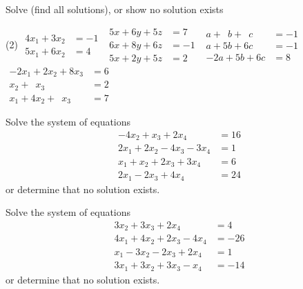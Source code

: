 \documentclass{ximera}
\begin{document}
\begin{exercise}%
    Solve (find all solutions), or show no solution exists
    \begin{tasks}(2)
        \task
        $\begin{aligned}
            4x_1+3x_2 & = -1 \\
            5x_1+6x_2 & = 4
        \end{aligned}$
        \task
        $\begin{aligned}
             5x+6y+5z & = 7 \\
             6x+8y+6z & = -1 \\
             5x+2y+5z & = 2
        \end{aligned}$
        \task
        $\begin{aligned}
            a+\phantom{5}b+\phantom{6}c & = -1 \\
            a+5b+6c & = -1 \\
            -2a+5b+6c & = 8
        \end{aligned}$
        \task
        $\begin{aligned}
            -2 x_1+2x_2+8x_3 & = 6 \\
            x_2+\phantom{8}x_3 & = 2 \\
            x_1+4x_2+\phantom{8}x_3 & = 7
        \end{aligned}$
    \end{tasks}
\end{exercise}

\begin{exercise}%
    Solve the system of equations
    \begin{equation*}
        \begin{split}
            -4x_2 + x_3 + 2x_4 &= 16 \\
            2x_1 + 2x_2 - 4x_3 - 3x_4 &= 1 \\
            x_1 + x_2 + 2x_3 + 3x_4 &= 6 \\
            2x_1 - 2x_3 + 4x_4 &= 24
        \end{split}
    \end{equation*}
    or determine that no solution exists. 
\end{exercise}

\begin{exercise}%
    Solve the system of equations
    \begin{equation*}
        \begin{split}
            3x_2 + 3x_3 + 2x_4 &= 4 \\
            4x_1 + 4x_2 + 2x_3 - 4x_4 &= -26 \\
            x_1 - 3x_2 -2x_3 + 2x_4 &= 1 \\
            3x_1 + 3x_2 + 3x_3  - x_4 &= -14
        \end{split}
    \end{equation*}
    or determine that no solution exists. 
\end{exercise}
\end{document}
